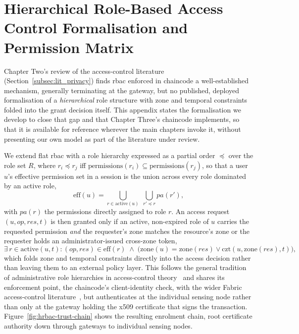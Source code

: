 \documentclass[12pt,a4paper,oneside]{book}
\begin{document}
\chapter{Hierarchical Role-Based Access Control Formalisation and Permission
Matrix}
\label{app:hrbac_matrix}

Chapter Two's review of the access-control literature
(Section~\ref{subsec:lit_privacy}) finds \gls{rbac} enforced in chaincode a
well-established mechanism, generally terminating at the gateway, but no
published, deployed formalisation of a \emph{hierarchical} role structure
with zone and temporal constraints folded into the grant decision itself.
This appendix states the formalisation we develop to close that gap and
that Chapter Three's chaincode implements, so that it is available for
reference wherever the main chapters invoke it, without presenting our own
model as part of the literature under review.

We extend flat \gls{rbac} with a role hierarchy expressed as a partial
order $\preceq$ over the role set $R$, where $r_i \preceq r_j$ iff
$\mathrm{permissions}(r_i) \subseteq \mathrm{permissions}(r_j)$, so that a
user $u$'s effective permission set in a session is the union across every
role dominated by an active role,
\begin{equation}
\mathrm{eff}(u) = \bigcup_{r \in \mathrm{active}(u)} \; \bigcup_{r' \preceq r} pa(r'),
\label{eq:hrbac_eff}
\end{equation}
with $pa(r)$ the permissions directly assigned to role $r$. An access
request $(u, op, res, t)$ is then granted only if an active, non-expired
role of $u$ carries the requested permission \emph{and} the requester's
zone matches the resource's zone or the requester holds an
administrator-issued cross-zone token,
\begin{equation}
\exists\, r \in \mathrm{active}(u,t) : (op,res) \in \mathrm{eff}(r)
\;\land\; \bigl(\mathrm{zone}(u) = \mathrm{zone}(res) \lor
\mathrm{czt}(u,\mathrm{zone}(res),t)\bigr),
\label{eq:hrbac_grant}
\end{equation}
which folds zone and temporal constraints directly into the access
decision rather than leaving them to an external policy layer. This
follows the general tradition of administrative role hierarchies in
access-control theory~\cite{lu2022revocation} and shares its enforcement
point, the chaincode's client-identity check, with the wider Fabric
access-control literature~\cite{mdpiAccessControl}, but authenticates at
the individual sensing node rather than only at the gateway holding the
\gls{x509} certificate that signs the transaction.
Figure~\ref{fig:hrbac-trust-chain} shows the resulting enrolment chain,
root certificate authority down through gateways to individual sensing
nodes.
\end{document}

